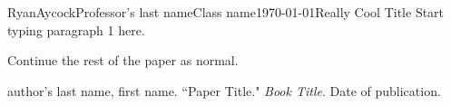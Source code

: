 \documentclass[12pt,letterpaper]{article}
\begin{document}
\begin{mla}{Ryan}{Aycock}{Professor's last name}{Class name}{\today}{Really Cool Title}
Start typing paragraph 1 here.

Continue the rest of the paper as normal.

\begin{workscited}

\bibent
author's last name, first name.  ``Paper Title."  \textit{Book Title}.  Date of publication.

\end{workscited}
\end{mla}
\end{document}
